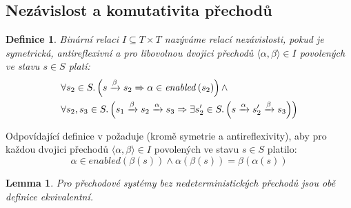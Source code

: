 \documentclass[12pt]{fithesis2}
\newtheorem{definition}{Definice}
\newtheorem{lemma}     {Lemma}
\newcommand{\tuple}[1]{\langle #1 \rangle}
\begin{document}
\subsection{Nezávislost a komutativita přechodů}

\begin{definition}
Binární relaci $I \subseteq T \times T$ nazýváme relací nezávislosti, pokud je symetrická, antireflexivní a pro libovolnou dvojici přechodů $\tuple{\alpha, \beta} \in I$ povolených ve stavu $s \in S$ platí:
\begin{equation}\label{eq:independent-my}
\begin{split}
&\forall s_2 \in S \ldotp
\left({
	s \xrightarrow{\beta} s_2
	\Rightarrow
	\alpha \in \mathit{enabled}\left({s_2}\right)
}\right)
\land \\
&\forall s_2, s_3 \in S \ldotp \left({
	s_1 \xrightarrow{\beta} s_2 \xrightarrow{\alpha} s_3
	\Rightarrow
	\exists s_2' \in S \ldotp \left({
		s \xrightarrow{\alpha} s_2' \xrightarrow{\beta} s_3
	}\right)
}\right)
\end{split}
\end{equation}

\end{definition}


Odpovídající definice v \cite{CLARKE} požaduje (kromě symetrie a antireflexivity), aby pro každou dvojici přechodů $\tuple{\alpha, \beta} \in I$ povolených ve stavu $s \in S $ platilo:
\begin{equation}\label{eq:independent-clarke}
\alpha \in \mathit{enabled}\left({ \beta\left({s}\right) }\right) \land
\alpha\left({\beta\left({s}\right)}\right) = \beta\left({\alpha\left({s}\right)}\right)
\end{equation}

\begin{lemma}
Pro přechodové systémy bez nedeterministických přechodů jsou obě definice ekvivalentní.
\end{lemma}
\end{document}

